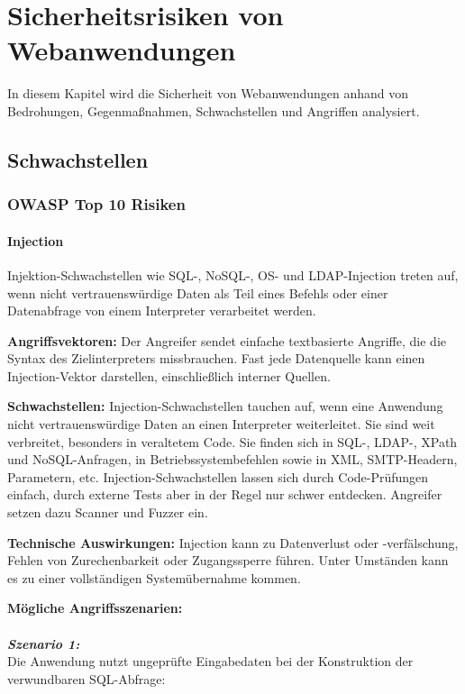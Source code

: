 \chapter{Sicherheitsrisiken von Webanwendungen}
\label{chap:k3}

In diesem Kapitel wird die Sicherheit von Webanwendungen anhand von Bedrohungen, Gegenmaßnahmen, Schwachstellen und Angriffen analysiert.

\section{Schwachstellen}

\subsection{OWASP Top 10 Risiken}

\subsubsection{Injection}

Injektion-Schwachstellen wie SQL-, NoSQL-, OS- und LDAP-Injection treten auf, wenn nicht vertrauenswürdige Daten als Teil eines Befehls oder einer Datenabfrage von einem Interpreter verarbeitet werden\cite[6]{owasp17top10}.

\textbf{Angriffsvektoren:} Der Angreifer sendet einfache textbasierte Angriffe, die die Syntax des Zielinterpreters missbrauchen. Fast jede Datenquelle kann einen Injection-Vektor darstellen, einschließlich interner Quellen\cite[7]{owasp17top10}.

\textbf{Schwachstellen:} Injection-Schwachstellen tauchen auf, wenn eine Anwendung nicht vertrauenswürdige Daten an einen Interpreter weiterleitet. Sie sind weit verbreitet, besonders in veraltetem Code. Sie finden sich in SQL-, LDAP-, XPath und NoSQL-Anfragen, in Betriebssystembefehlen sowie in XML, SMTP-Headern, Parametern, etc. Injection-Schwachstellen lassen sich durch Code-Prüfungen einfach, durch externe Tests aber in der Regel nur schwer entdecken. Angreifer setzen dazu Scanner und Fuzzer ein\cite[7]{owasp17top10}.

\textbf{Technische Auswirkungen:} Injection kann zu Datenverlust oder -verfälschung, Fehlen von Zurechenbarkeit oder Zugangssperre führen. Unter Umständen kann es zu einer vollständigen Systemübernahme kommen\cite[7]{owasp17top10}.

\textbf{Mögliche Angriffsszenarien:}\\
\\
\textbf{\textit{Szenario 1:}}\\
Die Anwendung nutzt ungeprüfte Eingabedaten bei der Konstruktion der verwundbaren SQL-Abfrage:

